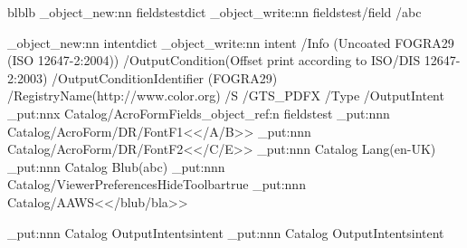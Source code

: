 \documentclass{article}
\begin{document}
\ExplSyntaxOn

blblb
\pdf_object_new:nn   {fieldstest}{dict}
\pdf_object_write:nn {fieldstest}{/field /abc}

\pdf_object_new:nn   {intent}{dict}
\pdf_object_write:nn {intent}{
    /Info (Uncoated FOGRA29 (ISO 12647-2:2004))
    /OutputCondition(Offset print according to ISO/DIS 12647-2:2003)
    /OutputConditionIdentifier (FOGRA29)
    /RegistryName(http://www.color.org)
    /S /GTS_PDFX
    /Type /OutputIntent}
\pdfdict_put:nnx {Catalog/AcroForm}{Fields}{\pdf_object_ref:n { fieldstest }}
\pdfdict_put:nnn {Catalog/AcroForm/DR/Font}{F1}{<</A/B>>}
\pdfdict_put:nnn {Catalog/AcroForm/DR/Font}{F2}{<</C/E>>}
\pdfdict_put:nnn {Catalog} {Lang}{(en-UK)}
\pdfdict_put:nnn {Catalog} {Blub}{(abc)}
\pdfdict_put:nnn {Catalog/ViewerPreferences}{HideToolbar}{true}
\pdfdict_put:nnn {Catalog/AA}{WS}{<</blub/bla>>}

\pdfdict_put:nnn {Catalog} {OutputIntents}{intent}
\pdfdict_put:nnn {Catalog} {OutputIntents}{intent}
\ExplSyntaxOff
\end{document}
